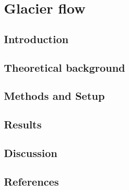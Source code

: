 

\renewcommand{\chapterauthor}{Julien, Linda, Moritz}
\chapter{Glacier flow}
\label{glacier_flow}

\begin{abstract}

\end{abstract}


\section{Introduction}


\section{Theoretical background}


\section{Methods and Setup}


\section{Results}


\section{Discussion}


\newpage
\section*{References}


